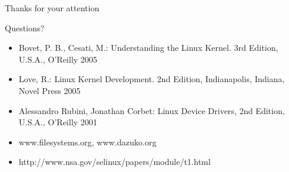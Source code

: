 \documentclass[30pt,a4paper,landscape,headrule,footrule]{foils}
\begin{document}
\foilhead[-2cm]{}
\vspace{1cm}
\begin{center}
\Huge{Thanks for your attention}
\end{center}
\vspace{2cm}
\begin{center}
\Huge{Questions?}
\end{center}



\begin{itemize}
\item Bovet, P. B., Cesati, M.: Understanding the Linux Kernel. 3rd Edition, U.S.A., O'Reilly 2005
\item Love, R.: Linux Kernel Development. 2nd Edition, Indianapolis, Indiana, Novel Press 2005
\item Alessandro Rubini, Jonathan Corbet: Linux Device Drivers, 2nd Edition, U.S.A., O'Reilly 2001
\item www.filesystems.org, www.dazuko.org
\item http://www.nsa.gov/selinux/papers/module/t1.html
\end{itemize}
\end{document}
